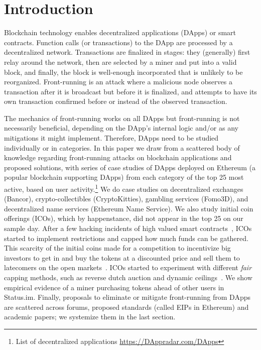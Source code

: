 
\section{Introduction} \label{sec:intro}

Blockchain technology enables decentralized applications (DApps) or smart contracts. Function calls (or transactions) to the DApp are processed by a decentralized network. Transactions are finalized in stages: they (generally) first relay around the network, then are selected by a miner and put into a valid block, and finally, the block is well-enough incorporated that is unlikely to be reorganized. Front-running is an attack where a malicious node observes a transaction after it is broadcast but before it is finalized, and attempts to have its own transaction confirmed before or instead of the observed transaction. 

The mechanics of front-running works on all DApps but front-running is not necessarily beneficial, depending on the DApp's internal logic and/or as any mitigations it might implement. Therefore, DApps need to be studied individually or in categories. In this paper we draw from a scattered body of knowledge regarding front-running attacks on blockchain applications and proposed solutions, with series of case studies of DApps deployed on Ethereum (a popular blockchain supporting DApps) from each category of the top 25 most active, based on user activity.\footnote{List of decentralized applications \url{https://DAppradar.com/DApps}} We do case studies on decentralized exchanges (\eg Bancor), crypto-collectibles (\eg CryptoKitties), gambling services (\eg Fomo3D), and decentralized name services (\eg Ethereum Name Service). We also study initial coin offerings (ICOs), which by happenstance, did not appear in the top 25 on our sample day. After a few hacking incidents of high valued smart contracts~\cite{siegel2016daohack}, ICOs started to implement restrictions and capped how much funds can be gathered. This scarcity of the initial coins made for a competition to incentivize big investors to get in and buy the tokens at a discounted price and sell them to latecomers on the open markets~\cite{zetzsche2018ico,li2018initial}. ICOs started to experiment with different \textit{fair} capping methods, such as reverse dutch auction and dynamic ceilings~\cite{kaal2017initial}. We show empirical evidence of a miner purchasing tokens ahead of other users in Status.im. Finally, proposals to eliminate or mitigate front-running from DApps are scattered across forums, proposed standards (called EIPs in Ethereum) and academic papers; we systemize them in the last section. 

